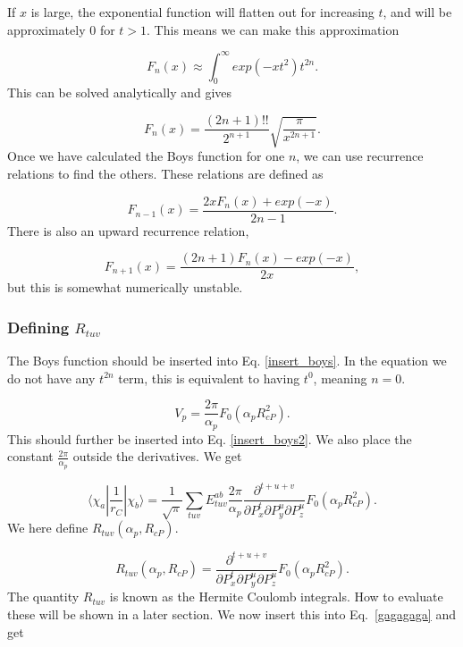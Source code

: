 \documentclass[a4paper,norsk,11pt,twoside]{report}
\begin{document}
If $x$ is large, the exponential function will flatten out for
increasing $t$, and will be approximately 0 for $t > 1$. This means we can make this 
approximation

\begin{equation}
F_n(x) \approx \int_0^{\infty} exp(-x t^2) t^{2n}  .
\end{equation}
This can be solved analytically and gives

\begin{equation}
F_n(x) = \frac{(2n + 1)!!}{2^{n+1}} 
\sqrt{\frac{\pi}{x^{2n+1}}} . \label{boys_int_2}
\end{equation}
Once we have calculated the Boys function for one $n$, we can use recurrence relations to find the others. These relations are defined as

\begin{equation}
F_{n-1}(x) = \frac{2x F_n(x) + exp(-x)}{2n - 1} .
\label{boys_int_3}
\end{equation}
There is also an upward recurrence relation, 

\begin{equation}
F_{n+1}(x) = \frac{(2n + 1) F_n(x) - exp(-x)}{2x} ,
\end{equation}
but this is somewhat numerically unstable.



\subsubsection{Defining $R_{tuv}$}
The Boys function should be inserted into Eq. \eqref{insert_boys}. In the equation we do not have any $t^{2n}$ term, this is equivalent to having $t^0$, meaning $n = 0$.

\begin{equation}
V_p = \frac{2 \pi}{\alpha_p}
F_0(\alpha_p R_{cP}^2) .
\end{equation}
This should further be inserted into Eq. \eqref{insert_boys2}. We also place the constant $\frac{2 \pi}{\alpha_p}$ outside the derivatives. We get

\begin{equation}
\langle \chi_a | \frac{1}{r_C} | \chi_b \rangle = \frac{1}{\sqrt{\pi}} \sum_{tuv} E_{tuv}^{ab}  \frac{2 \pi}{\alpha_p} \frac{\partial^{t+u+v}}{\partial P_x^t \partial P_y^u \partial P_z^u}
F_0(\alpha_p R_{cP}^2) . \label{gagagaga}
\end{equation}
We here define $R_{tuv}(\alpha_p, R_{cP})$. 

\begin{equation}
R_{tuv}(\alpha_p, R_{cP}) = 
\frac{\partial^{t+u+v}}{\partial P_x^t \partial P_y^u \partial P_z^u}
F_0(\alpha_p R_{cP}^2) .
\end{equation}
The quantity $R_{tuv}$ is known as the Hermite Coulomb integrals. How to evaluate these will be shown in a later section. We now insert this into Eq.~\eqref{gagagaga} and get
\end{document}
